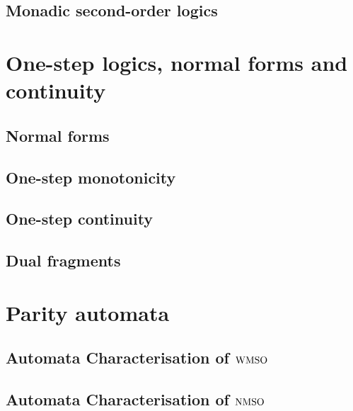 \documentclass[prodmode,acmtecs]{acmsmall} %
\begin{document}
\subsection{Monadic second-order logics}\label{sec:prel-so}


\clearpage





\section{One-step logics, normal forms and continuity}\label{sec:onestep}

\subsection{Normal forms}\label{subsec:normalforms}

\subsection{One-step monotonicity}\label{subsec:one-stepmonot}

\subsection{One-step continuity}\label{subsec:one-stepcont}

\subsection{Dual fragments}\label{subsec:one-stepduals}


\clearpage


\section{Parity automata}\label{sec:parityaut}



\subsection{Automata Characterisation of $\mathrm{WMSO}$}\label{sec:autwmso}



\subsection{Automata Characterisation of $\mathrm{NMSO}$}\label{sec:autnmso}
\end{document}
